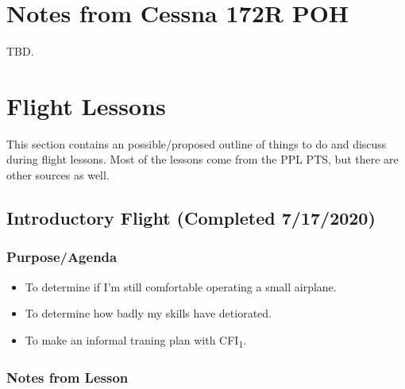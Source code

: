 \documentclass[letterpaper,10pt,titlepage]{article}
\begin{document}

\section{Notes from Cessna 172R POH}
\label{snrc0}

TBD.



\section{Flight Lessons}
\label{sfle0}

This section contains an possible/proposed outline of things to do and discuss
during flight lessons.  Most of the lessons come from the PPL PTS, but there
are other sources as well.



\subsection{Introductory Flight (Completed 7/17/2020)}
\label{sfle0:sint0}



\subsubsection{Purpose/Agenda}
\label{sfle0:sint0:spov0}

\begin{itemize}
\item To determine if I'm still comfortable operating a small airplane.
\item To determine how badly my skills have detiorated.
\item To make an informal traning plan with CFI\textsubscript{1}.
\end{itemize}


\subsubsection{Notes from Lesson}
\label{sfle0:sint0:snff0}
\end{document}
